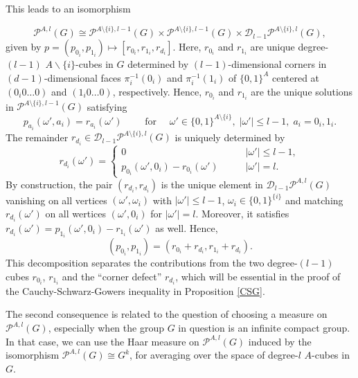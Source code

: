 \documentclass{amsart}
\theoremstyle{definition}
\theoremstyle{remark}
\numberwithin{equation}{section}
\begin{document}
This leads to an isomorphism 

\begin{equation}
\label{Pdecomp2}
    \mathcal{P}^{A,l}(G) \cong  \mathcal{P}^{A\setminus \{i\},l-1}(G) \times \mathcal{P}^{A\setminus \{i\},l-1}(G) \times \mathcal{D}_{l-1}\mathcal{P}^{A \setminus \{i\},l}(G),
\end{equation}
given by  $p = (p_{0_i},p_{1_i}) \mapsto [r_{0_i}, r_{1_i}, r_{d_i}]$. Here, $r_{0_i}$ and $r_{1_i}$ are unique degree-$(l-1)$ $A \backslash \{i\} $-cubes in $G$ determined by $(l-1)$-dimensional corners in $(d-1)$-dimensional faces $\pi_i^{-1}(0_i)$ and $\pi_i^{-1}(1_i)$  of $\{0,1\}^A$ centered at $(0_i0 \dots 0)$ and $(1_i0 \dots 0)$, respectively.
Hence,  $r_{0_i}$ and $r_{1_i}$ are the unique solutions in $\mathcal{P}^{A\setminus \{i\},l-1}(G)$ satisfying
$$ p_{a_i} (\omega', a_i) = r_{a_i}(\omega') \qquad \text{ for } \quad \omega' \in \{0,1\}^{A\setminus \{i\}}, \; |\omega'| \le l-1, \; a_i = 0_i,1_i. $$
The remainder $r_{d_i}\in \mathcal{D}_{l-1}\mathcal{P}^{A \setminus \{i\},l}(G)$ is uniquely determined by  
$$ r_{d_i}(\omega') = \begin{cases} 0   &\qquad   |\omega'| \le l-1,\\
p_{0_i} (\omega', 0_i) - r_{0_i}(\omega') &\qquad   |\omega'| = l. 
\end{cases}$$
By construction, the pair $(r_{d_i},r_{d_i})$ is the unique element in $\mathcal{D}_{l-1}\mathcal{P}^{A,l}(G)$ vanishing on all vertices  $(\omega',\omega_i)$ with $|\omega'|\le l-1$, $\omega_i \in \{0,1\}^{\{i\}}$ and matching $r_{d_i}(\omega')$ on all wertices 
 $(\omega', 0_i)$ for $|\omega'|=l$. Moreover, it satisfies  $r_{d_i}(\omega')= p_{1_i}(\omega', 0_i) - r_{1_i}(\omega')$ as well. Hence, 
\begin{equation}
\label{cornersplit}(p_{0_i},p_{1_i}) = (r_{0_i}+r_{d_i},r_{1_i}+r_{d_i}).
\end{equation} 
This decomposition separates the contributions from the two degree-$(l-1)$ cubes $r_{0_i}$, $r_{1_i}$ and the ``corner defect'' $r_{d_i}$, which will be essential in the proof of the Cauchy-Schwarz-Gowers inequality in Proposition \ref{CSG}.

The second consequence is related to the question of choosing a measure on $\mathcal{P}^{A,l}(G)$, especially when the group $G$ in question is an infinite compact group. In that case, we can use the Haar measure  on $\mathcal{P}^{A,l}(G)$ induced by the isomorphism $\mathcal{P}^{A,l}(G) \cong G^k$, for averaging over the space of degree-$l$ $A$-cubes in $G$.
\end{document}

